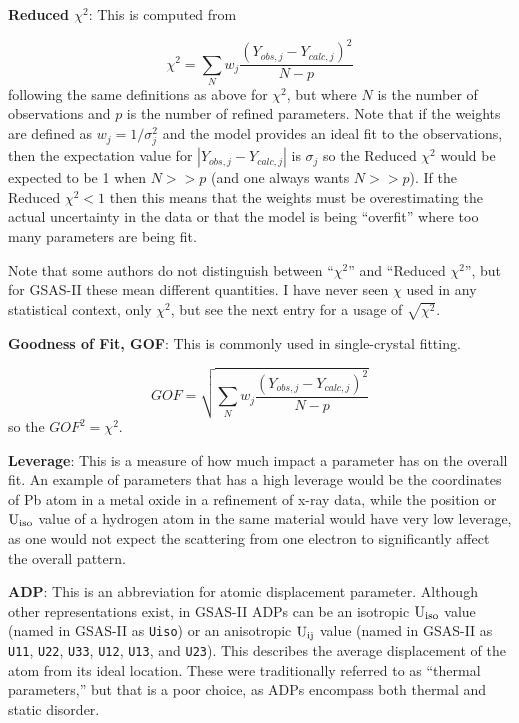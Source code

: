 \textbf{Reduced $\chi^2$}\label{ref:redchi2}: This is computed from 

$$\chi^2 = \sum_{N} w_j\frac{(Y_{obs,j} - Y_{calc,j})^2}{N-p}$$ 
following the same definitions as above for $\chi^2$, but where $N$ is the number of observations and $p$ is the number of refined parameters. Note that if the weights are defined as $w_j = 1/\sigma_j^2$ and the model provides an ideal fit to the observations, then the expectation value for $|Y_{obs,j} - Y_{calc,j}|$ is $\sigma_j$ so the Reduced $\chi^2$ would be expected to be 1 when $N>>p$ (and one always wants $N>>p$). If the Reduced $\chi^2 < 1$ then this means that the weights must be overestimating the actual uncertainty in the data or that the model is being ``overfit'' where too many parameters are being fit. 

Note that some authors do not distinguish between ``$\chi^2$'' and ``Reduced $\chi^2$'', but for GSAS-II these mean different quantities. I have never seen $\chi$ used in any statistical context, only $\chi^2$, but see the next entry for a usage of $\sqrt{\chi^2}$. 

\textbf{Goodness of Fit, GOF}\label{ref:GOF}: This is commonly used in single-crystal fitting. 

$$GOF = \sqrt{\sum_{N} w_j\frac{(Y_{obs,j} - Y_{calc,j})^2}{N-p}}$$
so the $GOF^2 = \chi^2$.

\textbf{Leverage}: This is a measure of how much impact a parameter has on the overall fit. An example of parameters that has a high leverage would be the coordinates of Pb atom in a metal oxide in a refinement of x-ray data, while the position or $\rm U_{iso}$ value of a hydrogen atom in the same material would have very low leverage, as one would not expect the scattering from one electron to significantly affect the overall pattern. 

\textbf{ADP}: This is an abbreviation for atomic displacement parameter. Although other representations exist, in GSAS-II ADPs can be an isotropic  $\rm U_{iso}$ value (named in GSAS-II as \texttt{Uiso}) or an anisotropic  $\rm U_{ij}$ value (named in GSAS-II as \texttt{U11}, \texttt{U22}, \texttt{U33}, \texttt{U12}, \texttt{U13}, and \texttt{U23}). This describes the average displacement of the atom from its ideal location. These were traditionally referred to as ``thermal parameters,'' but that is a poor choice, as ADPs encompass both thermal and static disorder. 

